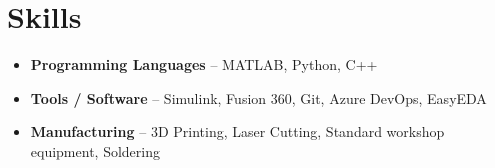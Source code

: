 \documentclass[a4paper,10pt]{article} %
\begin{document}
\section*{Skills}
\begin{itemize}
    \item \textbf{Programming Languages} – MATLAB, Python, C++
    \item \textbf{Tools / Software} –  Simulink, Fusion 360, Git, Azure DevOps, EasyEDA
    \item \textbf{Manufacturing} – 3D Printing, Laser Cutting, Standard workshop equipment, Soldering
\end{itemize}
\end{document}
